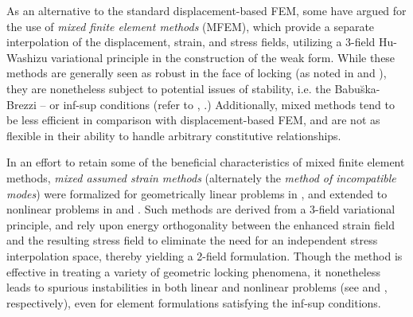 		As an alternative to the standard displacement-based FEM, some have argued for the use of \textit{mixed finite element methods} (MFEM), which provide a separate interpolation of the displacement, strain, and stress fields, utilizing a 3-field Hu-Washizu variational principle in the construction of the weak form. While these methods are generally seen as robust in the face of locking (as noted in \cite{Babuska&Suri:92:2} and \cite{Babuska&Suri:92:1}), they are nonetheless subject to potential issues of stability, i.e. the Babu\u{s}ka-Brezzi -- or inf-sup conditions (refer to \cite{Babuska:71}, \cite{Brezzi:74}.) Additionally, mixed methods tend to be less efficient in comparison with displacement-based FEM, and are not as flexible in their ability to handle arbitrary constitutive relationships. 
		
		In an effort to retain some of the beneficial characteristics of mixed finite element methods, \textit{mixed assumed strain methods} (alternately the \textit{method of incompatible modes}) were formalized for geometrically linear problems in \cite{Simo&Rifai:90}, and extended to nonlinear problems in \cite{Simo&Armero:92} and \cite{Simo&Armero&Taylor:93}. Such methods are derived from a 3-field variational principle, and rely upon energy orthogonality between the enhanced strain field and the resulting stress field to eliminate the need for an independent stress interpolation space, thereby yielding a 2-field formulation. Though the method is effective in treating a variety of geometric locking phenomena, it nonetheless leads to spurious instabilities in both linear and nonlinear problems (see \cite{Bathe&Sussman:14} and \cite{Bathe&Pantuso:97}, respectively), even for element formulations satisfying the inf-sup conditions.
			
